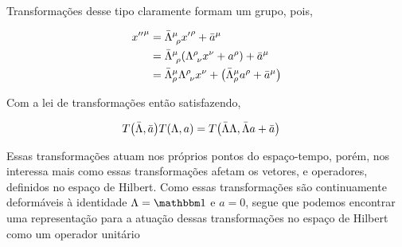 \documentclass[twoside]{amsart}
\numberwithin{equation}{section}
\begin{document}
Transformações desse tipo claramente formam um grupo, pois,

\begin{align*}
    {x''}^\mu&={\bar\Lambda}^\mu_{\ \rho}{x'}^\rho+{\bar a}^\mu\\
    &={\bar\Lambda}^\mu_{\ \rho}\qty(\Lambda^\rho_{\ \nu}x^\nu+ a^\rho)+{\bar a}^\mu\\
    &={\bar\Lambda}^\mu_{\rho}\Lambda^\rho_{\ \nu}x^\nu+\qty({\bar\Lambda}^\mu_{\rho}a^\rho+{\bar a}^\mu)
\end{align*}

Com a lei de transformações então satisfazendo,

\begin{align*}
    T\qty(\bar\Lambda,\bar a)T\qty(\Lambda, a)&=T\qty(\bar\Lambda\Lambda,\bar\Lambda a+\bar a)
\end{align*}

Essas transformações atuam nos próprios pontos do espaço-tempo, porém, nos interessa mais como essas transformações 
afetam os vetores, e operadores, definidos no espaço de Hilbert. Como essas transformações são continuamente deformáveis 
à identidade $\Lambda=\mathbbm 1$ e $a=0$, segue que podemos encontrar uma representação para a atuação dessas transformações no espaço de Hilbert como um operador unitário 


\end{document}

